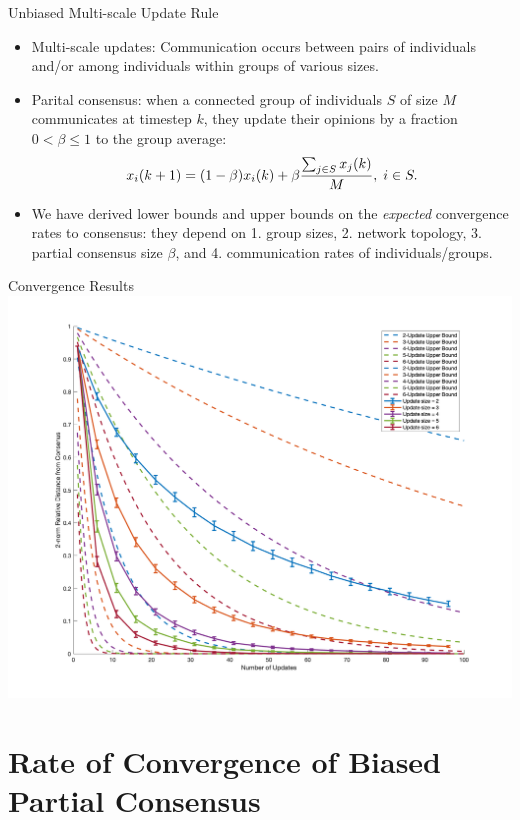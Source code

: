\documentclass[usenames,dvipsnames,10pt]{beamer}
\theoremstyle{remark}
\begin{document}
\begin{frame}{Unbiased Multi-scale Update Rule}
\begin{itemize}
    \item Multi-scale updates: Communication occurs between pairs of individuals and/or among individuals within groups of various sizes.
	    \pause
    \item Parital consensus: when a connected group of individuals $S$ of size $M$ communicates at timestep $k$, they update their opinions by a fraction $0<\beta\leq1$ to the group average:
    \begin{equation}{\label{eq:updateRule}}
        x_i(k+1) = (1-\beta)x_i(k) + \beta\frac{\sum_{j\in S}x_j(k)}{M}, \; i\in S.
    \end{equation}
    \pause
    \item We have derived lower bounds and upper bounds on the \textit{expected} convergence rates to consensus: they depend on 1. group sizes, 2. network topology, 3. partial consensus size $\beta$, and 4. communication rates of individuals/groups.
\end{itemize}
\end{frame}

\begin{frame}{Convergence Results}
	    \includegraphics[scale=.17]{../Figures/noBiasConvergenceErrorBounds.png}
\end{frame}

\section{Rate of Convergence of Biased Partial Consensus}
\end{document}
